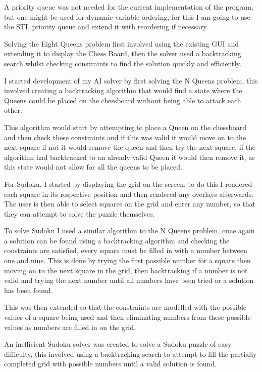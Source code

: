 \documentclass[]{final_report}
\begin{document}
A priority queue was not needed for the current implementation of the program, but one might be used for dynamic variable ordering, for this I am going to use the STL priority queue and extend it with reordering if necessary.

Solving the Eight Queens problem first involved using the existing GUI and extending it to display the Chess Board, then the solver used a backtracking search whilst checking constraints to find the solution quickly and efficiently.

I started development of my AI solver by first solving the N Queens problem, this involved creating a backtracking algorithm that would find a state where the Queens could be placed on the chessboard without being able to attack each other.

This algorithm would start by attempting to place a Queen on the chessboard and then check these constraints and if this was valid it would move on to the next square if not it would remove the queen and then try the next square, if the algorithm had backtracked to an already valid Queen it would then remove it, as this state would not allow for all the queens to be placed.

For Sudoku, I started by displaying the grid on the screen, to do this I rendered each square in its respective position and then rendered any overlays afterwards. The user is then able to select squares on the grid and enter any number, so that they can attempt to solve the puzzle themselves.

To solve Sudoku I used a similar algorithm to the N Queens problem, once again a solution can be found using a backtracking algorithm and checking the constraints are satisfied, every square must be filled in with a number between one and nine. This is done by trying the first possible number for a square then moving on to the next square in the grid, then backtracking if a number is not valid and trying the next number until all numbers have been tried or a solution has been found.

This was then extended so that the constraints are modelled with the possible values of a square being used and then eliminating numbers from these possible values as numbers are filled in on the grid.

An inefficient Sudoku solver was created to solve a Sudoku puzzle of easy difficulty, this involved using a backtracking search to attempt to fill the partially completed grid with possible numbers until a valid solution is found.
\end{document}
